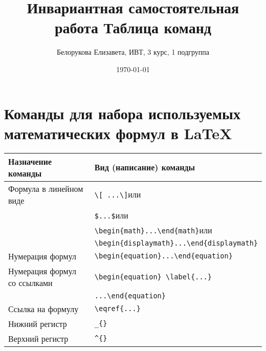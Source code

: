 \documentclass[a4paper,12pt]{article} %
\author{Белорукова Елизавета, ИВТ, 3 курс, 1 подгруппа}
\title{Инвариантная самостоятельная работа Таблица команд}
\date{\today}
\begin{document}
\maketitle
\newpage
\section{Команды для набора  используемых математических формул в \LaTeX{}}

\begin{tabular}{| l | l |}
\hline
\textbf{Назначение команды} & \textbf{Вид (написание) команды} \\
\hline
Формула в линейном виде & \verb|\[ ...\]|\hspace{20pt}или\\
  & \verb|$...$|\hspace{20pt}или\\
  & \verb|\begin{math}...\end{math}|\hspace{20pt}или\\
  & \verb|\begin{displaymath}...\end{displaymath}|\\
Нумерация формул & \verb|\begin{equation}...\end{equation}|\\
Нумерация формул со ссылками & \verb|\begin{equation} \label{...}|\\
  & \verb|...\end{equation}|\\
Ссылка на формулу & \verb|\eqref{...}|\\
Нижний регистр & \verb|_{}|\\
Верхний регистр & \verb|^{}|\\
\hline
\end{tabular}
\end{document}

